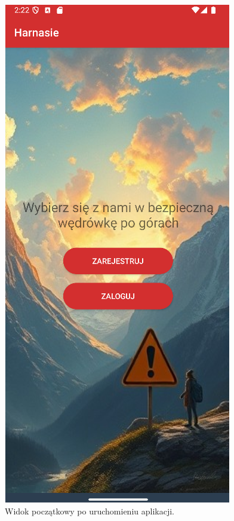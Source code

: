 \begin{figure}[H]
    \centering
    \includegraphics[scale=0.5]{img/imp/welcome.png}
    \caption{Widok początkowy po uruchomieniu aplikacji.}
    \label{widok:home}
\end{figure}
